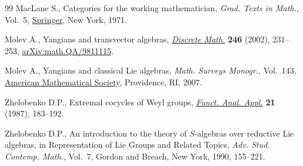 \documentclass[11pt]{article}
\numberwithin{equation}{section}
\begin{document}
\begin{thebibliography}{99}
MacLane S., Categories for the working mathematician, \textit{Grad. Texts in
 Math.}, Vol.~5, \href{https://doi.org/10.1007/978-1-4757-4721-8}{Springer}, New York, 1971.

Molev A., Yangians and transvector algebras, \href{https://doi.org/10.1016/S0012-365X(01)00260-6}{\textit{Discrete Math.}} \textbf{246} (2002), 231--253,
 \href{https://arxiv.org/abs/math.QA/9811115}{arXiv:math.QA/9811115}.

Molev A., Yangians and classical {L}ie algebras, \textit{Math. Surveys
 Monogr.}, Vol.~143, \href{https://doi.org/10.1090/surv/143}{American Mathematical Society}, Providence, RI, 2007.

Zhelobenko D.P., Extremal cocycles of {W}eyl groups, \href{https://doi.org/10.1007/BF02577133}{\textit{Funct. Anal.
 Appl.}} \textbf{21} (1987), 183--192.

Zhelobenko D.P., An introduction to the theory of {$S$}-algebras over reductive
 {L}ie algebras, in Representation of {L}ie {G}roups and {R}elated {T}opics,
 \textit{Adv. Stud. Contemp. Math.}, Vol.~7, Gordon and Breach, New York,
 1990, 155--221.

\end{thebibliography}
\end{document}
